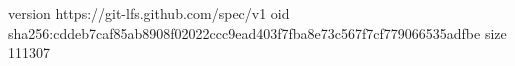 version https://git-lfs.github.com/spec/v1
oid sha256:cddeb7caf85ab8908f02022ccc9ead403f7fba8e73c567f7cf779066535adfbe
size 111307
